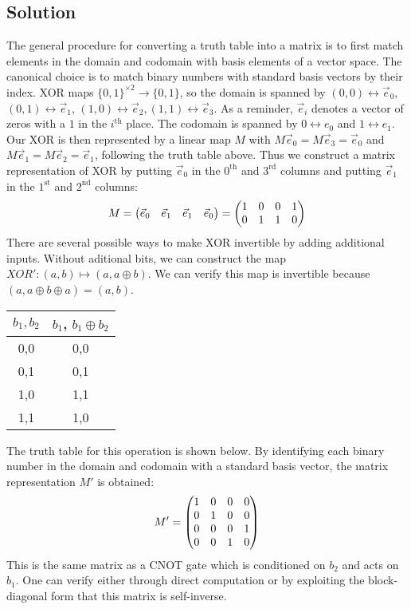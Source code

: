 \documentclass{article}
\begin{document}
\subsection*{Solution}
The general procedure for converting a truth table into a matrix is to first match elements in the domain and codomain with basis elements of a vector space. The canonical choice is to match binary numbers with standard basis vectors by their index. XOR maps $\{0,1\}^{\times 2} \to \{0, 1\}$, so the domain is spanned by $(0,0) \leftrightarrow \vec e_0$, $(0,1) \leftrightarrow \vec e_1$, $(1,0) \leftrightarrow \vec e_2, (1,1) \leftrightarrow \vec e_3$. As a reminder, $\vec e_i$ denotes a vector of zeros with a $1$ in the $i^\text{th}$ place. The codomain is spanned by $0 \leftrightarrow e_0$ and $1 \leftrightarrow e_1$. Our XOR is then represented by a linear map $M$ with $M\vec e_0 = M\vec e_3 = \vec e_0$ and $M\vec e_1 = M\vec e_2 = \vec e_1$, following the truth table above. Thus we construct a matrix representation of XOR by putting $\vec e_0$ in the $0^\text{th}$ and $3^\text{rd}$ columns and putting $\vec e_1$ in the $1^\text{st}$ and $2^\text{nd}$ columns:
$$
M = \mqty(\vec e_0 & \vec e_1 & \vec e_1 & \vec e_0) = \mqty(1 & 0 & 0 & 1 \\ 0 & 1 & 1 & 0)
$$
There are several possible ways to make XOR invertible by adding additional inputs. Without aditional bits, we can construct the map $XOR':(a,b) \mapsto (a, a\oplus b)$. We can verify this map is invertible because $(a, a\oplus b \oplus a) = (a,b)$. 
\begin{table}[hbt!]
\label{invertibleXOR}
\centering
\begin{tabular}{c|c}
    $b_1,b_2$ & $b_1$, $b_1 \oplus b_2$ \\
    \hline
    0,0 & 0,0\\
    0,1 & 0,1\\
    1,0 & 1,1\\
    1,1 & 1,0\\
\end{tabular}
\end{table}
The truth table for this operation is shown below. By identifying each binary number in the domain and codomain with a standard basis vector, the matrix representation $M'$ is obtained:
$$
M' = \mqty(1 & 0 & 0 & 0 \\ 0 & 1 & 0 & 0 \\ 0 & 0 & 0 & 1 \\ 0 & 0 & 1 & 0)
$$
This is the same matrix as a CNOT gate which is conditioned on $b_2$ and acts on $b_1$. One can verify either through direct computation or by exploiting the block-diagonal form that this matrix is self-inverse.
\end{document}
